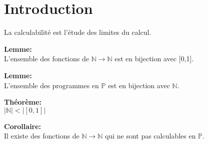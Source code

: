 \section{Introduction}
La calculabilité est l'étude des limites du calcul.

\textbf{Lemme:\\}
L'ensemble des fonctions de $\mathbb{N}\rightarrow\mathbb{N}$ est en bijection avec [0,1].

\textbf{Lemme:\\}
L'ensemble des programmes en $\mathbb{P}$ est en bijection avec $\mathbb{N}$.

\textbf{Théorème:\\}
$|\mathbb{N}|<|[0,1]|$

\textbf{Corollaire:\\}
Il existe des fonctions de $\mathbb{N}\rightarrow\mathbb{N}$ qui ne sont pas calculables en $\mathbb{P}$.
